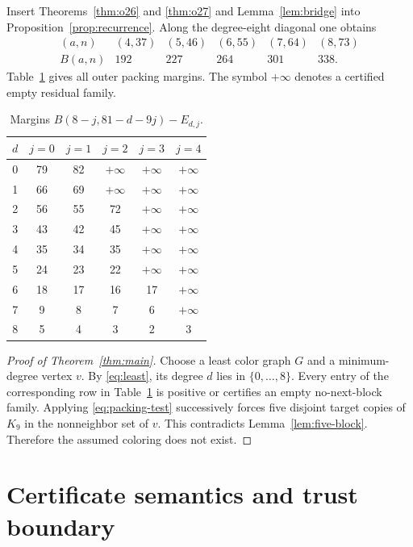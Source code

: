 \documentclass[11pt,reqno,a4paper]{amsart}
\theoremstyle{definition}
\theoremstyle{remark}
\newcommand{\emptycert}{+\infty}
\begin{document}
Insert Theorems~\ref{thm:o26} and \ref{thm:o27} and
Lemma~\ref{lem:bridge} into Proposition~\ref{prop:recurrence}. Along the
degree-eight diagonal one obtains
\begin{equation}\label{eq:diagonal}
\begin{array}{c|ccccc}
(a,n)&(4,37)&(5,46)&(6,55)&(7,64)&(8,73)\\ \hline
B(a,n)&192&227&264&301&338.
\end{array}
\end{equation}
Table~\ref{tab:margins} gives all outer packing margins. The symbol
$\emptycert$ denotes a certified empty residual family.

\begin{table}[ht]
\centering
\caption{Margins $B(8-j,81-d-9j)-E_{d,j}$.}
\label{tab:margins}
\footnotesize
\begin{tabular}{c@{\qquad}ccccc}
\toprule
$d$&$j=0$&$j=1$&$j=2$&$j=3$&$j=4$\\
\midrule
0&79&82&$\emptycert$&$\emptycert$&$\emptycert$\\
1&66&69&$\emptycert$&$\emptycert$&$\emptycert$\\
2&56&55&72&$\emptycert$&$\emptycert$\\
3&43&42&45&$\emptycert$&$\emptycert$\\
4&35&34&35&$\emptycert$&$\emptycert$\\
5&24&23&22&$\emptycert$&$\emptycert$\\
6&18&17&16&17&$\emptycert$\\
7&9&8&7&6&$\emptycert$\\
8&5&4&3&2&3\\
\bottomrule
\end{tabular}
\end{table}

\begin{proof}[Proof of Theorem~\ref{thm:main}]
Choose a least color graph $G$ and a minimum-degree vertex $v$. By
\eqref{eq:least}, its degree $d$ lies in $\{0,\ldots,8\}$. Every entry
of the corresponding row in Table~\ref{tab:margins} is positive or
certifies an empty no-next-block family. Applying
\eqref{eq:packing-test} successively forces five disjoint target copies
of $K_9$ in the nonneighbor set of $v$. This contradicts
Lemma~\ref{lem:five-block}. Therefore the assumed coloring does not
exist.
\end{proof}

\section{Certificate semantics and trust boundary}\label{sec:trust}
\end{document}
